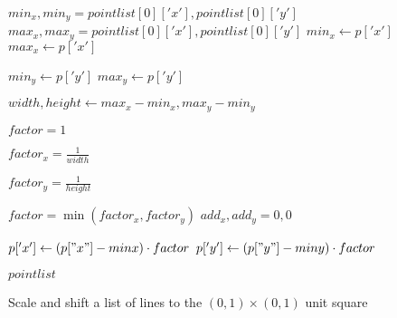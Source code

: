 \begin{algorithm}[ht]
    \begin{algorithmic}
            \State $min_x, min_y = pointlist[0]['x'], pointlist[0]['y']$
            \State $max_x, max_y = pointlist[0]['x'], pointlist[0]['y']$
                        \State $min_x \gets p['x']$
                        \State $max_x \gets p['x']$
                    \EndIf

                        \State $min_y \gets p['y']$
                        \State $max_y \gets p['y']$
                    \EndIf
                \EndFor
            \EndFor

            \State $width, height \gets max_x - min_x, max_y - min_y$

            \State $factor = 1$

                \State $factor_x = \frac{1}{width}$
            \EndIf

                \State $factor_y = \frac{1}{height}$
            \EndIf

            \State $factor = \min(factor_x, factor_y)$
            \State $add_x, add_y = 0, 0$

                    \State $p['x'] \gets (p["x"] - minx) \cdot factor$
                    \State $p['y'] \gets (p["y"] - miny) \cdot factor$
                \EndFor
            \EndFor

            \Return $pointlist$
        \EndFunction
    \end{algorithmic}
\caption{Scale and shift a list of lines to the $(0,1) \times (0, 1)$ unit square}
\label{alg:scale-and-shift}
\end{algorithm}
